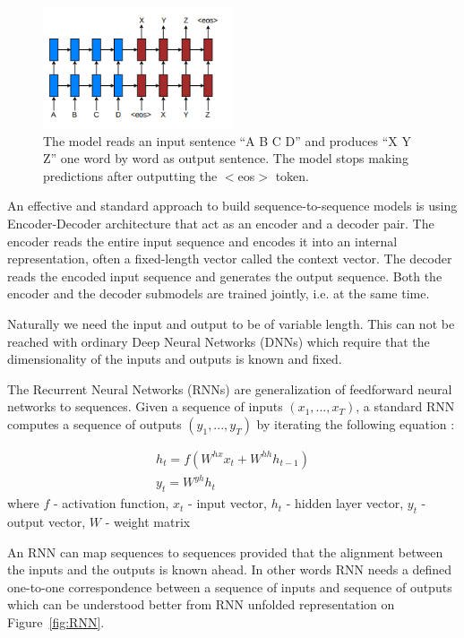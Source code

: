 \begin{figure}[ht]
	\centering
	\includegraphics[width=0.5\textwidth]{img/seq-to-seq.png}
	\caption{\label{fig:seq-to-seq}The model reads an input sentence “A B C D” and produces “X Y Z” one word by word as output sentence. The model stops making predictions after outputting the $<$eos$>$ token.  }
\end{figure}


An effective and standard approach to build sequence-to-sequence models is using Encoder-Decoder architecture that act as an encoder and a decoder pair. The encoder reads the entire input sequence and encodes it into an internal representation, often a fixed-length vector called the context vector. The decoder reads the encoded input sequence and generates the output sequence. Both the encoder and the decoder submodels are trained jointly, i.e. at the same time.

Naturally we need the input and output to be of variable length. This can not be reached with ordinary Deep Neural Networks (DNNs) which require that the dimensionality of the inputs and outputs is known and fixed. 

The Recurrent Neural Networks (RNNs) are generalization of feedforward neural networks to sequences. Given a sequence of inputs $(x_1, ..., x_T)$, a standard RNN computes a
sequence of outputs $(y_1, ..., y_T)$ by iterating the following equation \cite{seq2seq_with_NN} :

\begin{equation}
\begin{array}{l}
	h_t = f(W^{hx}x_t + W^{hh}h_{t-1}) \\
	y_t = W^{yh}h_t
\end{array}
\end{equation}
where 
$f$ - activation function,
$x_{t}$ - input vector, 
$h_{t}$ - hidden layer vector,
$y_{t}$ - output vector,
$W$ - weight matrix
 
 
An RNN can map sequences to sequences provided that the alignment between the inputs and the outputs is known ahead. In other words RNN needs a defined one-to-one correspondence between a sequence of inputs and sequence of outputs which can be understood better from RNN unfolded representation on Figure~\ref{fig:RNN}.

